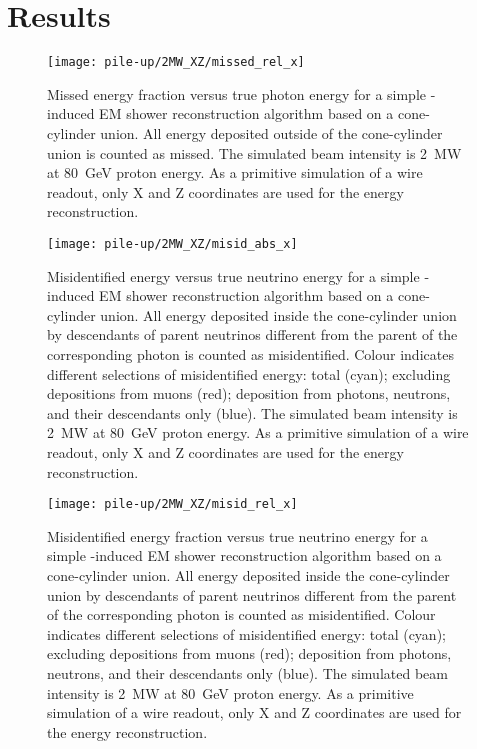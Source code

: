 \section{Results}
\label{sec:dune-nd_results}

\begin{figure}[htb]
	\centering
	\texttt{[image: pile-up/2MW\_XZ/missed\_rel\_x]}
	\caption{Missed energy fraction versus true photon energy for a simple \Pgpz-induced EM shower reconstruction algorithm based on a cone-cylinder union.
		All energy deposited outside of the cone-cylinder union is counted as missed.
		The simulated beam intensity is \SI{2}{\mega\watt} at \SI{80}{\giga\electronvolt} proton energy.
		As a primitive simulation of a wire readout, only X and Z coordinates are used for the energy reconstruction.}
	\label{fig:dune-nd_2MW-XZ_missed-rel-x}
\end{figure}

\begin{figure}[htb]
	\centering
	\texttt{[image: pile-up/2MW\_XZ/misid\_abs\_x]}
	\caption{Misidentified energy versus true neutrino energy for a simple \Pgpz-induced EM shower reconstruction algorithm based on a cone-cylinder union.
		All energy deposited inside the cone-cylinder union by descendants of parent neutrinos different from the parent of the corresponding \Pgpz photon is counted as misidentified.
		Colour indicates different selections of misidentified energy: total (cyan); excluding depositions from muons (red); deposition from photons, neutrons, and their descendants only (blue).
		The simulated beam intensity is \SI{2}{\mega\watt} at \SI{80}{\giga\electronvolt} proton energy.
		As a primitive simulation of a wire readout, only X and Z coordinates are used for the energy reconstruction.}
	\label{fig:dune-nd_2MW-XZ_misid-abs-x}
\end{figure}

\begin{figure}[htb]
	\centering
	\texttt{[image: pile-up/2MW\_XZ/misid\_rel\_x]}
	\caption{Misidentified energy fraction versus true neutrino energy for a simple \Pgpz-induced EM shower reconstruction algorithm based on a cone-cylinder union.
		All energy deposited inside the cone-cylinder union by descendants of parent neutrinos different from the parent of the corresponding \Pgpz photon is counted as misidentified.
		Colour indicates different selections of misidentified energy: total (cyan); excluding depositions from muons (red); deposition from photons, neutrons, and their descendants only (blue).
		The simulated beam intensity is \SI{2}{\mega\watt} at \SI{80}{\giga\electronvolt} proton energy.
		As a primitive simulation of a wire readout, only X and Z coordinates are used for the energy reconstruction.}
	\label{fig:dune-nd_2MW-XZ_misid-rel-x}
\end{figure}

